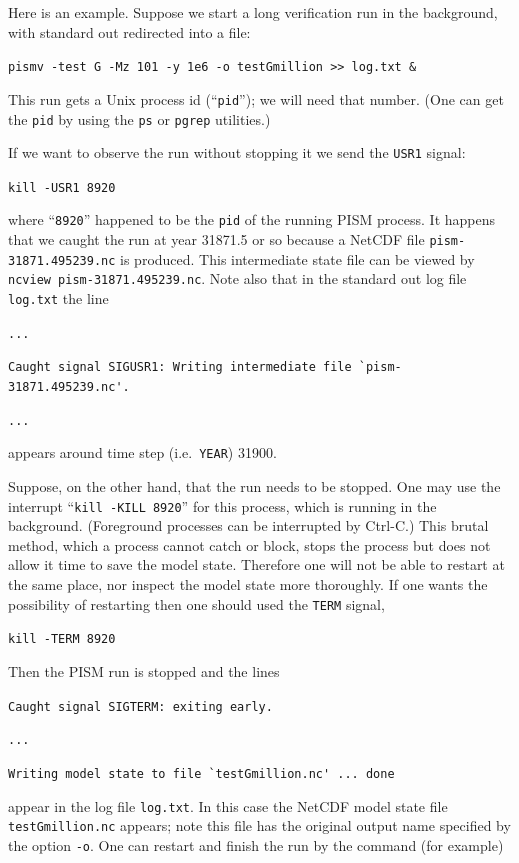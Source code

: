 \documentclass[11pt,final]{amsart}
\begin{document}
Here is an example.  Suppose we start a long verification run in the background, with standard out redirected into a file:

\verb|pismv -test G -Mz 101 -y 1e6 -o testGmillion >> log.txt &|

\noindent This run gets a Unix process id (``\verb|pid|''); we will need that number.  (One can get the \verb|pid| by using the \verb|ps| or \verb|pgrep| utilities.)

If we want to observe the run without stopping it we send the \verb|USR1| signal:

\verb|kill -USR1 8920|

\noindent where ``\verb|8920|'' happened to be the \verb|pid| of the running PISM process.  It happens that we caught the run at year 31871.5 or so because a NetCDF file \verb|pism-31871.495239.nc| is produced.  This intermediate state file can be viewed by \verb|ncview pism-31871.495239.nc|.  Note also that in the standard out log file \verb|log.txt| the line

\verb|...|

\verb|Caught signal SIGUSR1: Writing intermediate file `pism-31871.495239.nc'.|

\verb|...|

\noindent appears around time step (i.e.~\verb|YEAR|) 31900.

Suppose, on the other hand, that the run needs to be stopped.  One may use the interrupt ``\verb|kill -KILL 8920|'' for this process, which is running in the background.  (Foreground processes can be interrupted by Ctrl-C.)  This brutal method, which a process cannot catch or block, stops the process but does not allow it  time to save the model state.  Therefore one will not be able to restart at the same place, nor inspect the model state more thoroughly.  If one wants the possibility of restarting then one should used the \verb|TERM| signal,

\verb|kill -TERM 8920|

\noindent Then the PISM run is stopped and the lines

\verb|Caught signal SIGTERM: exiting early.|

\verb|...|

\verb|Writing model state to file `testGmillion.nc' ... done|

\noindent appear in the log file \verb|log.txt|.  In this case the NetCDF model state file \verb|testGmillion.nc| appears; note this file has the original output name specified by the option \verb|-o|.  One can restart and finish the run by the command (for example)
\end{document}
